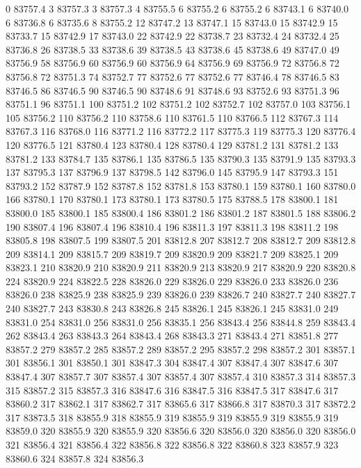 0 83757.4
3 83757.3
3 83757.3
4 83755.5
6 83755.2
6 83755.2
6 83743.1
6 83740.0
6 83736.8
6 83735.6
8 83755.2
12 83747.2
13 83747.1
15 83743.0
15 83742.9
15 83733.7
15 83742.9
17 83743.0
22 83742.9
22 83738.7
23 83732.4
24 83732.4
25 83736.8
26 83738.5
33 83738.6
39 83738.5
43 83738.6
45 83738.6
49 83747.0
49 83756.9
58 83756.9
60 83756.9
60 83756.9
64 83756.9
69 83756.9
72 83756.8
72 83756.8
72 83751.3
74 83752.7
77 83752.6
77 83752.6
77 83746.4
78 83746.5
83 83746.5
86 83746.5
90 83746.5
90 83748.6
91 83748.6
93 83752.6
93 83751.3
96 83751.1
96 83751.1
100 83751.2
102 83751.2
102 83752.7
102 83757.0
103 83756.1
105 83756.2
110 83756.2
110 83758.6
110 83761.5
110 83766.5
112 83767.3
114 83767.3
116 83768.0
116 83771.2
116 83772.2
117 83775.3
119 83775.3
120 83776.4
120 83776.5
121 83780.4
123 83780.4
128 83780.4
129 83781.2
131 83781.2
133 83781.2
133 83784.7
135 83786.1
135 83786.5
135 83790.3
135 83791.9
135 83793.3
137 83795.3
137 83796.9
137 83798.5
142 83796.0
145 83795.9
147 83793.3
151 83793.2
152 83787.9
152 83787.8
152 83781.8
153 83780.1
159 83780.1
160 83780.0
166 83780.1
170 83780.1
173 83780.1
173 83780.5
175 83788.5
178 83800.1
181 83800.0
185 83800.1
185 83800.4
186 83801.2
186 83801.2
187 83801.5
188 83806.2
190 83807.4
196 83807.4
196 83810.4
196 83811.3
197 83811.3
198 83811.2
198 83805.8
198 83807.5
199 83807.5
201 83812.8
207 83812.7
208 83812.7
209 83812.8
209 83814.1
209 83815.7
209 83819.7
209 83820.9
209 83821.7
209 83825.1
209 83823.1
210 83820.9
210 83820.9
211 83820.9
213 83820.9
217 83820.9
220 83820.8
224 83820.9
224 83822.5
228 83826.0
229 83826.0
229 83826.0
233 83826.0
236 83826.0
238 83825.9
238 83825.9
239 83826.0
239 83826.7
240 83827.7
240 83827.7
240 83827.7
243 83830.8
243 83826.8
245 83826.1
245 83826.1
245 83831.0
249 83831.0
254 83831.0
256 83831.0
256 83835.1
256 83843.4
256 83844.8
259 83843.4
262 83843.4
263 83843.3
264 83843.4
268 83843.3
271 83843.4
271 83851.8
277 83857.2
279 83857.2
285 83857.2
289 83857.2
295 83857.2
298 83857.2
301 83857.1
301 83856.1
301 83850.1
301 83847.3
304 83847.4
307 83847.4
307 83847.6
307 83847.4
307 83857.7
307 83857.4
307 83857.4
307 83857.4
310 83857.3
314 83857.3
315 83857.2
315 83857.3
316 83847.6
316 83847.5
316 83847.5
317 83847.6
317 83860.2
317 83862.1
317 83862.7
317 83865.6
317 83866.8
317 83870.3
317 83872.2
317 83873.5
318 83855.9
318 83855.9
319 83855.9
319 83855.9
319 83855.9
319 83859.0
320 83855.9
320 83855.9
320 83856.6
320 83856.0
320 83856.0
320 83856.0
321 83856.4
321 83856.4
322 83856.8
322 83856.8
322 83860.8
323 83857.9
323 83860.6
324 83857.8
324 83856.3
